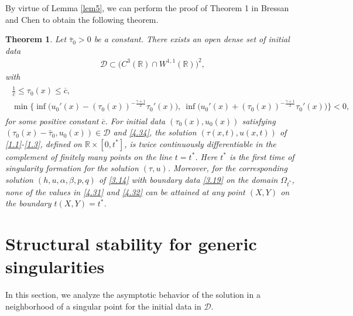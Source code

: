 \documentclass[11pt,reqno]{article}
\newtheorem{thm}{Theorem}
\newcommand{\dps}{\displaystyle}
\newcommand{\fr}{\frac}
\numberwithin{equation}{section}
\begin{document}
By virtue of Lemma \ref{lem5}, we can perform the proof of Theorem 1 in Bressan and Chen \cite{BC1} to obtain the following theorem.
\begin{thm}\label{thm1}
Let $\bar{\tau}_0>0$ be a constant. There exists an open dense set of initial data
\begin{align}\label{4.33}
\mathcal{D}\subset\Big(C^3(\mathbb{R})\cap W^{1,1}(\mathbb{R})\Big)^2,
\end{align}
with
\begin{align}\label{4.34}
\begin{array}{c}
\dps\fr{1}{\overline{c}}\leq \tau_0(x)\leq \overline{c}, \\[6pt]
\dps\min\bigg\{\inf\Big(u_{0}'(x)-(\tau_0(x))^{-\fr{\gamma+1}{2}}\tau_{0}'(x)\Big),\ \inf\Big(u_{0}'(x)+(\tau_0(x))^{-\fr{\gamma+1}{2}}\tau_{0}'(x)\Big)\bigg\}<0,
\end{array}
\end{align}
for some positive constant $\overline{c}$. For initial data $(\tau_0(x), u_0(x))$ satisfying $(\tau_0(x)-\bar{\tau}_0, u_0(x))\in \mathcal{D}$ and \eqref{4.34},
the solution $(\tau(x,t), u(x,t))$ of \eqref{1.1}-\eqref{1.3}, defined on $\mathbb{R}\times[0,t^*]$, is twice continuously differentiable in the complement of finitely many points on the line $t=t^*$. Here $t^*$ is the first time of singularity formation for the solution $(\tau, u)$.
Moreover, for the corresponding solution $(h, u, \alpha, \beta, p, q)$ of \eqref{3.14} with boundary data \eqref{3.19} on the domain $\Omega_{t^*}$, none of the values in \eqref{4.31} and \eqref{4.32} can be attained at any point $(X,Y)$ on the boundary $t(X,Y)=t^*$.
\end{thm}




\section{Structural stability for generic singularities}\label{S5}

In this section, we analyze the asymptotic behavior of the solution in a neighborhood of a singular point for the initial data in $\mathcal{D}$.
\end{document}
